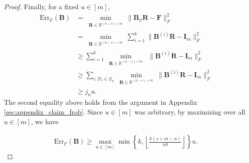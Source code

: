 \documentclass[journal,draftcls,onecolumn]{IEEEtran}
\theoremstyle{mystyle}
\newcommand{\floor}[1]{\left\lfloor #1\right\rfloor}
\begin{document}
\begin{proof}
 Finally, for a fixed $u \in [m]$,
\begin{align*}
 \text{Err}_{\mathcal{C}}(\mathbf{B})  & =\min\limits_{\substack{\mathbf{R}\in \mathbb{R}^{(n-s) \times m}}} {\|\mathbf{B}_{\mathcal{C}} \mathbf{R}- \mathbf{F}\|_F^2}\\
 &= \min\limits_{\substack{\mathbf{R}\in \mathbb{R}^{(n-s) \times m} }}\sum_{i = 1}^k   {\|\mathbf{B}^{(i)} \mathbf{R}- \mathbf{I}_m\|_F^2}\\
 &\ge \sum_{i = 1}^k \min\limits_{\substack{\mathbf{R}\in \mathbb{R}^{(n-s) \times m} }}\  {\|\mathbf{B}^{(i)} \mathbf{R}- \mathbf{I}_m\|_F^2}\\
 &\ge \sum_{i:\mathcal{D}_i \in \mathcal{Q}_u} \min\limits_{\substack{\mathbf{R}\in \mathbb{R}^{(n-s) \times m} }}  {\|\mathbf{B}^{(i)} \mathbf{R}- \mathbf{I}_m\|_F^2}\\
 & \ge  j_u u.
\end{align*}
The second equality above holds from the argument in Appendix \ref{sec:appendix_claim_frob}. Since $u \in [m]$ was arbitrary, by maximizing over all $u \in [m]$, we have

\begin{align*}
 \text{Err}_{\mathcal{C}}(\mathbf{B}) \ge \max_{u \in [m]} \min\left\{k,
\left\lfloor\frac{k(s+m-u)}{n\delta}\right\rfloor\right\}u.
\end{align*}

\end{proof}
\end{document}
